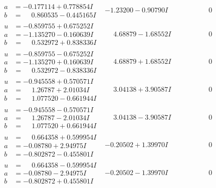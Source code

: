 \documentclass[1p]{elsarticle_modified}
\theoremstyle{definition}
\begin{document}
$$\begin{array}{c|c|c}
\begin{aligned}
a &= -0.177114 + 0.778854 I \\
b &= \phantom{-}0.860535 - 0.445165 I\end{aligned}
 & -1.23200 - 0.90790 I & \phantom{-0.000000 } 0 \\ \hline\begin{aligned}
u &= -0.859755 + 0.675252 I \\
a &= -1.135270 - 0.160639 I \\
b &= \phantom{-}0.532972 + 0.838336 I\end{aligned}
 & \phantom{-}4.68879 - 1.68552 I & \phantom{-0.000000 } 0 \\ \hline\begin{aligned}
u &= -0.859755 - 0.675252 I \\
a &= -1.135270 + 0.160639 I \\
b &= \phantom{-}0.532972 - 0.838336 I\end{aligned}
 & \phantom{-}4.68879 + 1.68552 I & \phantom{-0.000000 } 0 \\ \hline\begin{aligned}
u &= -0.945558 + 0.570571 I \\
a &= \phantom{-}1.26787 + 2.01034 I \\
b &= \phantom{-}1.077520 - 0.661944 I\end{aligned}
 & \phantom{-}3.04138 + 3.90587 I & \phantom{-0.000000 } 0 \\ \hline\begin{aligned}
u &= -0.945558 - 0.570571 I \\
a &= \phantom{-}1.26787 - 2.01034 I \\
b &= \phantom{-}1.077520 + 0.661944 I\end{aligned}
 & \phantom{-}3.04138 - 3.90587 I & \phantom{-0.000000 } 0 \\ \hline\begin{aligned}
u &= \phantom{-}0.664358 + 0.599954 I \\
a &= -0.08780 + 2.94975 I \\
b &= -0.802872 - 0.455801 I\end{aligned}
 & -0.20502 + 1.39970 I & \phantom{-0.000000 } 0 \\ \hline\begin{aligned}
u &= \phantom{-}0.664358 - 0.599954 I \\
a &= -0.08780 - 2.94975 I \\
b &= -0.802872 + 0.455801 I\end{aligned}
 & -0.20502 - 1.39970 I & \phantom{-0.000000 } 0 \\ \hline\begin{aligned}

\end{aligned}
\end{array}$$
\end{document}
